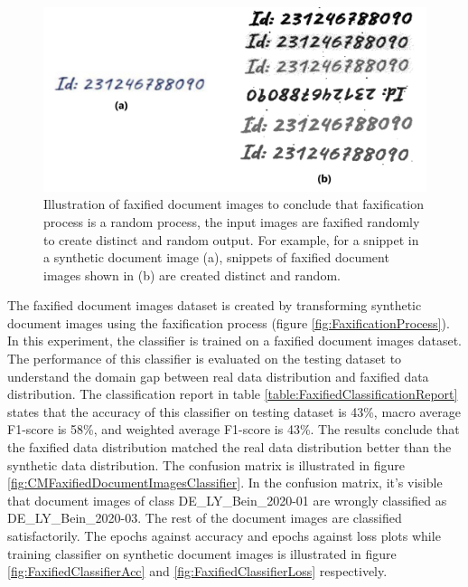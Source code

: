 \begin{figure}[H]
        \begin{center}
	    \includegraphics[scale=0.15]{images/Evaluation/FaxificationProcessZoomed.jpg}
	    \caption[Illustration of faxified document images to conclude that faxification process is a random process, the input images are faxified randomly to create distinct output.]{Illustration of faxified document images to conclude that faxification process is a random process, the input images are faxified randomly to create distinct and random output. For example, for a snippet in a synthetic document image (a), snippets of faxified document images shown in (b) are created distinct and random.}
	    \label{fig:FaxificationProcessZoomed}
	    \end{center}
\end{figure}

The faxified document images dataset is created by transforming synthetic document images using the faxification process (figure \ref{fig:FaxificationProcess}). In this experiment, the classifier is trained on a faxified document images dataset. The performance of this classifier is evaluated on the testing dataset to understand the domain gap between real data distribution and faxified data distribution. The classification report in table \ref{table:FaxifiedClassificationReport} states that the accuracy of this classifier on testing dataset is 43\%, macro average F1-score is  58\%, and weighted average F1-score is 43\%. The results conclude that the faxified data distribution matched the real data distribution better than the synthetic data distribution. The confusion matrix is illustrated in figure \ref{fig:CMFaxifiedDocumentImagesClassifier}. In the confusion matrix, it's visible that document images of class DE\_LY\_Bein\_2020-01 are wrongly classified as DE\_LY\_Bein\_2020-03. The rest of the document images are classified satisfactorily. The epochs against accuracy and epochs against loss plots while training classifier on synthetic document images is illustrated in figure \ref{fig:FaxifiedClassifierAcc} and \ref{fig:FaxifiedClassifierLoss} respectively.

